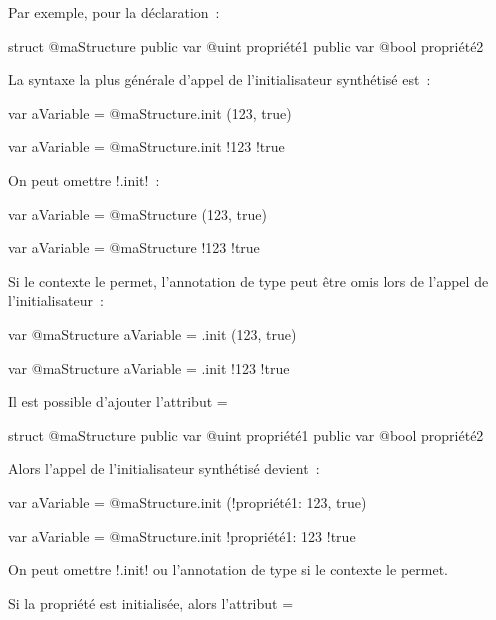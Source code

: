 Par exemple, pour la déclaration~:
\begin{galgas34}
struct @maStructure {
  public var @uint propriété1
  public var @bool propriété2
}
\end{galgas34}

La syntaxe la plus générale d'appel de l'initialisateur synthétisé est~:
\begin{galgas34}
var aVariable = @maStructure.init (123, true)
\end{galgas34}
\begin{galgas3}
var aVariable = @maStructure.init {!123 !true}
\end{galgas3}

On peut omettre \ggsq!.init!~:
\begin{galgas34}
var aVariable = @maStructure (123, true)
\end{galgas34}
\begin{galgas3}
var aVariable = @maStructure {!123 !true}
\end{galgas3}


Si le contexte le permet, l'annotation de type peut être omis lors de l'appel de l'initialisateur~:
\begin{galgas34}
var @maStructure aVariable = .init (123, true)
\end{galgas34}
\begin{galgas3}
var @maStructure aVariable = .init {!123 !true}
\end{galgas3}


Il est possible d'ajouter l'attribut \ggsq=%
\begin{galgas3}
struct @maStructure {
  public var @uint propriété1 %
  public var @bool propriété2
}
\end{galgas3}

Alors l'appel de l'initialisateur synthétisé devient~:
\begin{galgas4}
var aVariable = @maStructure.init (!propriété1: 123, true)
\end{galgas4}
\begin{galgas3}
var aVariable = @maStructure.init {!propriété1: 123 !true}
\end{galgas3}

On peut omettre \ggsq!.init! ou l'annotation de type si le contexte le permet.

Si la propriété est initialisée, alors l'attribut \ggsq=%


